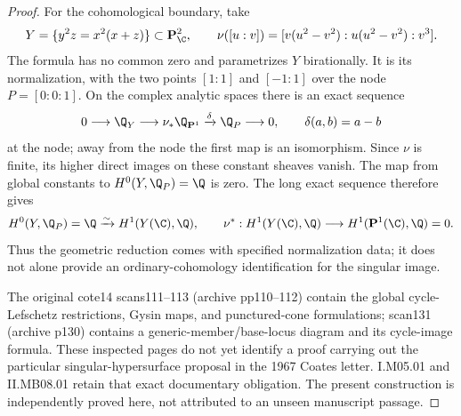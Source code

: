 \begin{proof}
For the cohomological boundary, take
\[
 Y=\{y^2z=x^2(x+z)\}\subset\mathbf P^2_\C,
 \qquad
 \nu([u:v])=[v(u^2-v^2):u(u^2-v^2):v^3].
\]
The formula has no common zero and parametrizes $Y$ birationally. It is its normalization, with the two points $[1:1]$ and $[-1:1]$ over the node $P=[0:0:1]$. On the complex analytic spaces there is an exact sequence
\[
 0\longrightarrow\Q_Y\longrightarrow\nu_*\Q_{\mathbf P^1}
 \xrightarrow{\delta}\Q_P\longrightarrow0,
 \qquad \delta(a,b)=a-b
\]
at the node; away from the node the first map is an isomorphism. Since $\nu$ is finite, its higher direct images on these constant sheaves vanish. The map from global constants to $H^0(Y,\Q_P)=\Q$ is zero. The long exact sequence therefore gives
\[
 H^0(Y,\Q_P)=\Q\xrightarrow{\sim}H^1(Y(\C),\Q),
 \qquad
 \nu^*:H^1(Y(\C),\Q)\longrightarrow H^1(\mathbf P^1(\C),\Q)=0.
\]
Thus the geometric reduction comes with specified normalization data; it does not alone provide an ordinary-cohomology identification for the singular image.

The original cote14 scans111--113 (archive pp110--112) contain the global cycle-Lefschetz restrictions, Gysin maps, and punctured-cone formulations; scan131 (archive p130) contains a generic-member/base-locus diagram and its cycle-image formula. These inspected pages do not yet identify a proof carrying out the particular singular-hypersurface proposal in the 1967 Coates letter. I.M05.01 and II.MB08.01 retain that exact documentary obligation. The present construction is independently proved here, not attributed to an unseen manuscript passage.
\end{proof}

